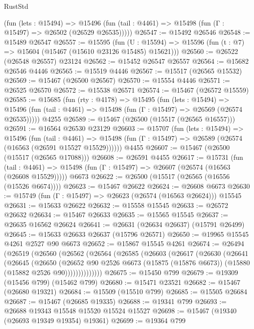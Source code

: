 \begin{lexlean}{RustStd}
\begin{coremodule}
      (fun (lets : @15494) =>
      @15496 (fun (tail : @4461) => @15498 (fun (Γ : @15497) => @26502 (@26529 @26535)))))
@26547 := @15492 @26546
@26548 := @15489 @26547
@26557 := @15595
    (fun (U : @15594) => @15596 (fun (t : @7) => @15604 (@15467 (@15610 @23126 @15485) @15621)))
@26560 := @26522 (@26548 @26557) @23124
@26562 := @15452 @26547 @26557
@26564 := @15682 @26546 @4446
@26565 := @15519 @4446
@26567 := @15517 (@26565 @15532)
@26569 := @15467 (@26500 @26567)
@26570 := @15554 @4446
@26571 := @26525 @26570
@26572 := @15538 @26571
@26574 := @15467 (@26572 @15559)
@26585 := @15685
    (fun (rty : @4178) =>
    @15495
      (fun (lets : @15494) =>
      @15496 (fun (tail : @4461) => @15498 (fun (Γ : @15497) => @26569 (@26574 @26535)))))
    @4255
@26589 := @15467 (@26500 (@15517 (@26565 @16557)))
@26591 := @16564 @26530 @23129
@26603 := @15707
    (fun (lets : @15494) =>
    @15496
      (fun (tail : @4461) =>
      @15498 (fun (Γ : @15497) => @26589 (@26574 (@16563 (@26591 @15527 @15529))))))
    @4455
@26607 := @15467 (@26500 (@15517 (@26565 @17088)))
@26608 := @26591 @4455
@26617 := @15731
    (fun (tail : @4461) => @15498 (fun (Γ : @15497) => @26607 (@26574 (@16563 (@26608 @15529)))))
    @6673
@26622 := @26500 (@15517 (@26565 (@16556 (@15526 @6674))))
@26623 := @15467 @26622
@26624 := @26608 @6673
@26630 := @15749 (fun (Γ : @15497) => @26623 (@26574 (@16563 @26624))) @15545
@26631 := @15633 @26622
@26632 := @15558 @15545
@26633 := @26572 @26632
@26634 := @15467 @26633
@26635 := @15565 @15545
@26637 := @26635 @16562 @26624
@26641 := @26631 (@26634 @26637) (@15791 @26499)
@26645 := @15633 @26633 @26637 (@15796 @26571)
@26650 := @19965 @15545 @4261 @2527 @90 @6673
@26652 := @15867 @15545 @4261
@26674 := @26494
    (@26519
      (@26560
        (@26562
          (@26564
            (@26585
              (@26603
                (@26617
                  (@26630
                    (@26641
                      (@26645
                        (@26650
                          (@26652
                            @90
                            @2526
                            @6673
                            (@15875 (@15876 @6673))
                            (@15880 (@15882 @2526 @90))))))))))))))
@26675 := @15450 @799
@26679 := @19309 (@15456 @799) (@15462 @799)
@26680 := @15471 @23521
@26682 := @15467 (@26680 @19321)
@26684 := @15509 (@15510 @799)
@26685 := @15505 @26684
@26687 := @15467 (@26685 @19335)
@26688 := @19341 @799
@26693 := @26688 @19343 @15548 @15520 @15524 @15527
@26698 := @15467 (@19340 (@26693 @19349 @19354) @19361)
@26699 := @19364 @799

\end{coremodule}
\end{lexlean}
